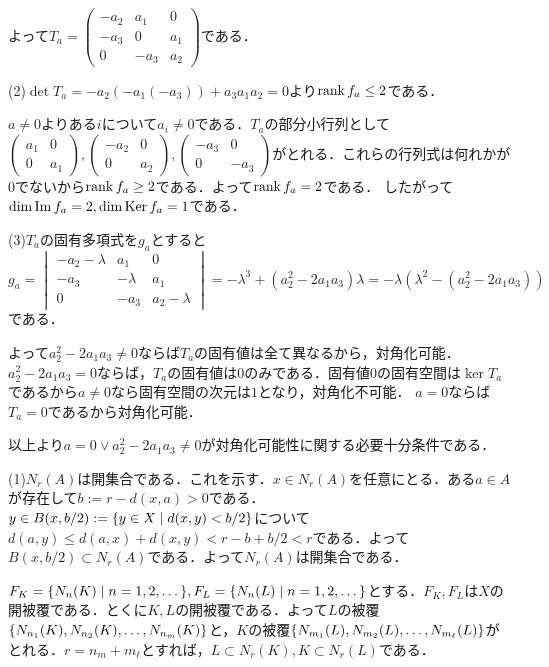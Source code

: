 \documentclass[
		book,
		head_space=20mm,
		foot_space=20mm,
		gutter=10mm,
		line_length=190mm
]{jlreq}
\begin{document}
よって$T_a=\begin{pmatrix}
	-a_2 & a_1 & 0\\
	-a_3 & 0 & a_1\\
	0 & -a_3 & a_2
\end{pmatrix}$である．

(2)$\det T_a=-a_2(-a_1(-a_3))+a_3a_1a_2=0$より$\rank f_a \le 2$である．

$a\neq 0$よりある$i$について$a_i\neq 0$である．$T_a$の部分小行列として$\begin{pmatrix}
	a_1 & 0\\
	0 & a_1
	\end{pmatrix},\begin{pmatrix}
	-a_2 & 0\\
	0 & a_2
	\end{pmatrix},\begin{pmatrix}
	-a_3 & 0\\
	0 & -a_3
	\end{pmatrix}$がとれる．これらの行列式は何れかが$0$でないから$\rank f_a \ge 2$である．よって$\rank f_a=2$である．
	したがって$\dim \mathop{\mathrm{Im}} f_a=2,\dim \mathop{\mathrm{Ker}} f_a=1$である．

(3)$T_a$の固有多項式を$g_a$とすると
$g_a=\begin{vmatrix}
	-a_2-\lambda & a_1 & 0\\
	-a_3 & -\lambda & a_1\\
	0 & -a_3 & a_2-\lambda
\end{vmatrix}=-\lambda^3+(a_2^2-2a_1a_3)\lambda=-\lambda(\lambda^2-(a_2^2-2a_1a_3))$である．

よって$a_2^2-2a_1a_3\neq 0$ならば$T_a$の固有値は全て異なるから，対角化可能．
$a_2^2-2a_1a_3=0$ならば，$T_a$の固有値は$0$のみである．固有値$0$の固有空間は$\ker T_a$であるから$a\neq 0$なら固有空間の次元は$1$となり，対角化不可能．
$a=0$ならば$T_a=0$であるから対角化可能．

以上より$a=0 \lor a_2^2-2a_1a_3\neq 0$が対角化可能性に関する必要十分条件である．

(1)$N_r(A)$は開集合である．これを示す．$x \in N_r(A)$を任意にとる．ある$a\in A$が存在して$b:=r-d(x,a)>0$である．
$y \in B(x,b/2):=\qty{ y \in X\mathrel{}\middle|\mathrel{} d(x,y)<b/2}$について$d(a,y)\le d(a,x)+d(x,y)<r-b+b/2<r$である．よって$B(x,b/2)\subset N_r(A)$である．よって$N_r(A)$は開集合である．

$F_K=\qty{ N_n(K)\mathrel{}\middle|\mathrel{} n = 1,2,\dots},F_L=\qty{ N_n(L)\mathrel{}\middle|\mathrel{} n = 1,2,\dots}$とする．$F_K,F_L$は$X$の開被覆である．とくに$K,L$の開被覆である．よって$L$の被覆$\qty{N_{n_1}(K),N_{n_2}(K),\dots,N_{n_m}(K)}$と，$K$の被覆$\qty{N_{m_1}(L),N_{m_2}(L),\dots,N_{m_\ell}(L)}$がとれる．$r=n_m+m_\ell$とすれば，$L\subset N_{r}(K),K\subset N_{r}(L)$である．
\end{document}
